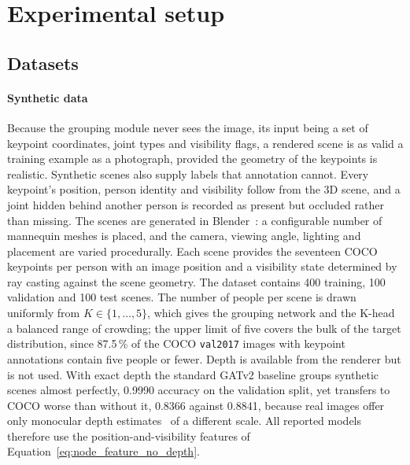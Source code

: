 \section{Experimental setup}
\label{sec:setup}

\subsection{Datasets}
\label{sec:setup_data}

\paragraph{Synthetic data}
Because the grouping module never sees the image, its input being a set of keypoint coordinates, joint types
and visibility flags, a rendered scene is as valid a training example as a photograph, provided the geometry of the
keypoints is realistic.
Synthetic scenes also supply labels that annotation cannot.
Every keypoint's position, person identity and visibility follow from the 3D scene,
and a joint hidden behind another person is recorded as present but occluded rather than missing.
The scenes are generated in Blender~\citep{blender}: a configurable number of mannequin meshes is placed, and the
camera, viewing angle, lighting and placement are varied procedurally.
Each scene provides the seventeen COCO keypoints per person with an image position
and a visibility state determined by ray casting against the scene geometry.
The dataset contains 400 training, 100 validation and 100 test scenes.
The number of people per scene is drawn uniformly from $K \in \{1,\dots,5\}$, which gives the grouping network
and the K-head a balanced range of crowding;
the upper limit of five covers the bulk of the target distribution, since
87.5\,\% of the COCO \texttt{val2017} images with keypoint annotations contain five people or fewer.
Depth is available from the renderer but is not used.
With exact depth the standard GATv2 baseline groups synthetic scenes almost perfectly,
0.9990 accuracy on the validation split, yet transfers to COCO worse than without it, 0.8366 against 0.8841,
because real images offer only monocular depth estimates~\citep{ranftl2020midas} of a different scale.
All reported models therefore use the position-and-visibility features of Equation~\eqref{eq:node_feature_no_depth}.

